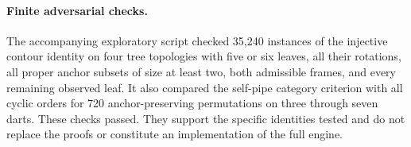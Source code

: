 \paragraph{Finite adversarial checks.}
The accompanying exploratory script checked 35,240 instances of the
injective contour identity on four tree topologies with five or six
leaves, all their rotations, all proper anchor subsets of size at least
two, both admissible frames, and every remaining observed leaf. It also
compared the self-pipe category criterion with all cyclic orders for 720
anchor-preserving permutations on three through seven darts. These
checks passed. They support the specific identities tested and do not
replace the proofs or constitute an implementation of the full engine.
